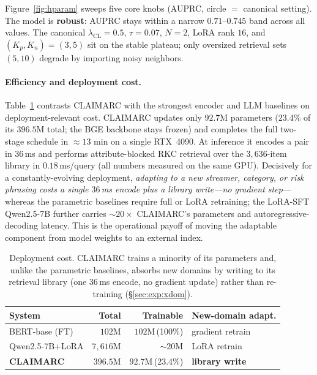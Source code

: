 Figure~\ref{fig:hparam} sweeps five core knobs (AUPRC, circle $=$ canonical
setting). The model is \textbf{robust}: AUPRC stays within a narrow
$0.71$--$0.745$ band across all values. The canonical
$\lambda_{\mathrm{CL}}{=}0.5$, $\tau{=}0.07$, $N{=}2$, LoRA rank $16$, and
$(K_p,K_n){=}(3,5)$ sit on the stable plateau; only oversized retrieval sets
$(5,10)$ degrade by importing noisy neighbors.

\paragraph{Efficiency and deployment cost.}
Table~\ref{tab:eff} contrasts CLAIMARC with the strongest encoder and LLM
baselines on deployment-relevant cost. CLAIMARC updates only $92.7$M parameters
($23.4\%$ of its $396.5$M total; the BGE backbone stays frozen) and completes the
full two-stage schedule in $\approx\!13$ min on a single RTX~4090. At inference it
encodes a pair in $36$\,ms and performs attribute-blocked RKC retrieval over the
$3{,}636$-item library in $0.18$\,ms/query (all numbers measured on the same
GPU). Decisively for a constantly-evolving deployment, \emph{adapting to a new
streamer, category, or risk phrasing costs a single $36$\,ms encode plus a
library write---no gradient step}---whereas the parametric baselines require full
or LoRA retraining; the LoRA-SFT Qwen2.5-7B further carries $\sim$$20\times$
CLAIMARC's parameters and autoregressive-decoding latency. This is the
operational payoff of moving the adaptable component from model weights to an
external index.

\begin{table}[t]
\centering\small
\setlength{\tabcolsep}{4pt}
\begin{tabular}{lrrl}
\toprule
\textbf{System} & \textbf{Total} & \textbf{Trainable} & \textbf{New-domain adapt.} \\
\midrule
BERT-base (FT)    & $102$M     & $102$M\,(100\%)             & gradient retrain \\
Qwen2.5-7B+LoRA   & $7{,}616$M & ${\sim}20$M                 & LoRA retrain \\
\textbf{CLAIMARC} & $396.5$M   & $\mathbf{92.7}$M\,(23.4\%)  & \textbf{library write} \\
\bottomrule
\end{tabular}
\caption{Deployment cost. CLAIMARC trains a minority of its parameters and, unlike
the parametric baselines, absorbs new domains by writing to its retrieval library
(one $36$\,ms encode, no gradient update) rather than re-training
(\S\ref{sec:exp:xdom}).}
\label{tab:eff}
\end{table}

